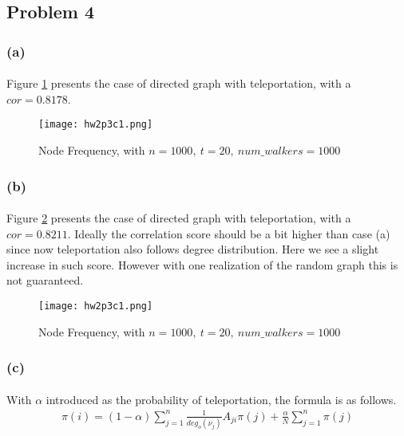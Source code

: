 \subsection*{Problem 4}
\subsubsection*{(a)}
\paragraph{}
Figure \ref{fig:d1} presents the case of directed graph with teleportation, with a $cor = 0.8178$.
\begin{figure} [h!]
	\centering
	\texttt{[image: hw2p3c1.png]}
	\caption{Node Frequency, with $n = 1000,\ t = 20,\ num\_walkers = 1000$}
	\label{fig:d1}
\end{figure}
\subsubsection*{(b)}
\paragraph{}
Figure \ref{fig:d2} presents the case of directed graph with teleportation, with a $cor = 0.8211$. Ideally the correlation score should be a bit higher than case (a) since now teleportation also follows degree distribution. Here we see a slight increase in such score. However with one realization of the random graph this is not guaranteed.
\begin{figure} [h!]
	\centering
	\texttt{[image: hw2p3c1.png]}
	\caption{Node Frequency, with $n = 1000,\ t = 20,\ num\_walkers = 1000$}
	\label{fig:d2}
\end{figure}
\subsubsection*{(c)}
\paragraph{}
With $\alpha$ introduced as the probability of teleportation, the formula is as follows.
\begin{align*}
	\pi(i)=(1-\alpha)\sum_{j=1}^{n}\frac{1}{deg_o(\nu_j)}A_{ji}\pi(j) + \frac{\alpha}{N} \sum_{j=1}^{n}\pi(j)
\end{align*}